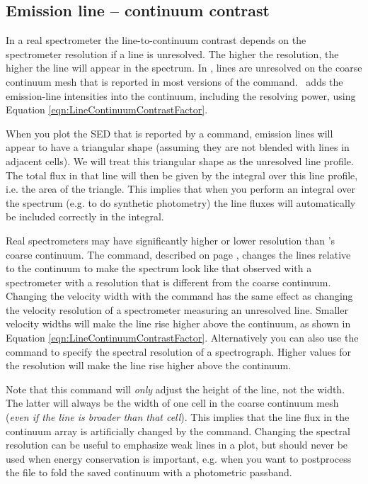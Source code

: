 \subsection{Emission line -- continuum contrast}

In a real spectrometer the line-to-continuum contrast
depends on the spectrometer resolution if a line is unresolved.
The higher the resolution, the higher the line will appear in the spectrum.
In \Cloudy, lines are  unresolved on the coarse continuum mesh that is reported
in most versions of the  command.
\Cloudy\ adds the emission-line intensities into the continuum, including the resolving power,
using Equation \ref{eqn:LineContinuumContrastFactor}.

When you plot the SED that is reported by a 
command, emission lines will appear to have a triangular shape (assuming they
are not blended with lines in adjacent cells). We will treat this triangular
shape as the unresolved line profile. The total flux in that line will then be
given by the integral over this line profile, i.e. the area of the triangle.
This implies that when you perform an integral over the spectrum (e.g. to do
synthetic photometry) the line fluxes will automatically be included correctly
in the integral.

Real spectrometers may have significantly higher or lower resolution than 
\Cloudy 's coarse continuum.
The  command,
described on page \pageref{sec:CommandSetSaveLWidth}, 
changes the lines relative to the continuum to make the spectrum
look like that observed with a spectrometer with a resolution that is different
from the coarse continuum.
Changing the velocity width with the
 command  
has the same effect as changing the 
velocity resolution of a spectrometer measuring an unresolved line.
Smaller velocity widths will make the line rise higher above the continuum,
as shown in Equation \ref{eqn:LineContinuumContrastFactor}.
Alternatively you can also use the 
command to specify the spectral resolution of a spectrograph. Higher
values for the resolution will make the line rise higher above the continuum.

Note that this command will {\em only} adjust the height of the line, not the
width. The latter will always be the width of one cell in the coarse continuum mesh
({\em even if the line is broader than that cell}). This implies that
the line flux in the continuum array is artificially changed by the
 command.
Changing the spectral resolution can be useful to emphasize weak lines in a plot,
but should never be used when energy conservation is important, e.g. when
you want to postprocess the file to fold the saved continuum with a photometric passband.

